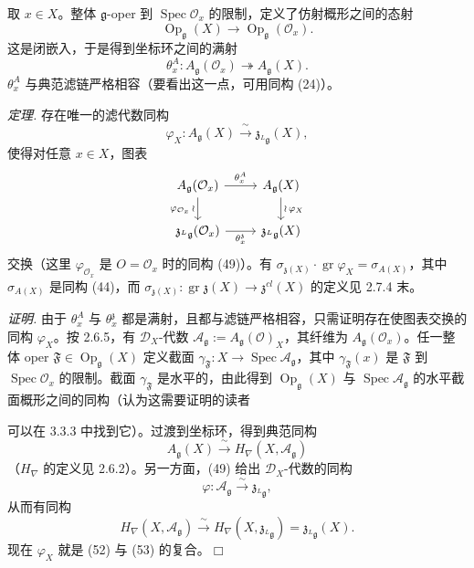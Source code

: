 
取 $x\in X$。整体 $\mathfrak{g}$-oper 到 $\operatorname{Spec}\mathcal{O}_{x}$ 的限制，定义了仿射概形之间的态射
\[
  \operatorname{Op}_{\mathfrak{g}}(X)\longrightarrow\operatorname{Op}_{\mathfrak{g}}(\mathcal{O}_{x}).
\]
这是闭嵌入，于是得到坐标环之间的满射
\begin{equation}\tag{50}
  \theta_{x}^{A} : A_{\mathfrak{g}}(\mathcal{O}_{x})\twoheadrightarrow A_{\mathfrak{g}}(X).
\end{equation}
$\theta_{x}^{A}$ 与典范滤链严格相容（要看出这一点，可用同构 (24)）。

 \emph{定理.} 存在唯一的滤代数同构
\begin{equation}\tag{51}
  \varphi_{X} : A_{\mathfrak{g}}(X)\xrightarrow{\ \sim\ }\mathfrak{z}_{{}^{L}\mathfrak{g}}(X),
\end{equation}
使得对任意 $x\in X$，图表
\[
\begin{tikzcd}
  A_{\mathfrak{g}}(\mathcal{O}_{x}) \arrow[r, "\theta_{x}^{A}"] \arrow[d, "\varphi_{\mathcal{O}_{x}}\,\wr"']
    & A_{\mathfrak{g}}(X) \arrow[d, "\wr\,\varphi_{X}"] \\
  \mathfrak{z}_{{}^{L}\mathfrak{g}}(\mathcal{O}_{x}) \arrow[r, "\theta_{x}^{\mathfrak{z}}"']
    & \mathfrak{z}_{{}^{L}\mathfrak{g}}(X)
\end{tikzcd}
\]
交换（这里 $\varphi_{\mathcal{O}_{x}}$ 是 $O=\mathcal{O}_{x}$ 时的同构 (49)）。有 $\sigma_{\mathfrak{z}(X)}\cdot\operatorname{gr}\varphi_{X}=\sigma_{A(X)}$，其中 $\sigma_{A(X)}$ 是同构 (44)，而 $\sigma_{\mathfrak{z}(X)}:\operatorname{gr}\mathfrak{z}(X)\to\mathfrak{z}^{cl}(X)$ 的定义见 2.7.4 末。

\emph{证明.} 由于 $\theta_{x}^{A}$ 与 $\theta_{x}^{\mathfrak{z}}$ 都是满射，且都与滤链严格相容，只需证明存在使图表交换的同构 $\varphi_{X}$。按 2.6.5，有 $\mathcal{D}_{X}$-代数 $\mathcal{A}_{\mathfrak{g}}:=A_{\mathfrak{g}}(\mathcal{O})_{X}$，其纤维为 $A_{\mathfrak{g}}(\mathcal{O}_{x})$。任一整体 oper $\mathfrak{F}\in\operatorname{Op}_{\mathfrak{g}}(X)$ 定义截面 $\gamma_{\mathfrak{F}}:X\to\operatorname{Spec}\mathcal{A}_{\mathfrak{g}}$，其中 $\gamma_{\mathfrak{F}}(x)$ 是 $\mathfrak{F}$ 到 $\operatorname{Spec}\mathcal{O}_{x}$ 的限制。截面 $\gamma_{\mathfrak{F}}$ 是水平的，由此得到 $\operatorname{Op}_{\mathfrak{g}}(X)$ 与 $\operatorname{Spec}\mathcal{A}_{\mathfrak{g}}$ 的水平截面概形之间的同构（认为这需要证明的读者

可以在 3.3.3 中找到它）。过渡到坐标环，得到典范同构
\begin{equation}\tag{52}
  A_{\mathfrak{g}}(X)\xrightarrow{\ \sim\ }H_{\nabla}(X,\mathcal{A}_{\mathfrak{g}})
\end{equation}
（$H_{\nabla}$ 的定义见 2.6.2）。另一方面，(49) 给出 $\mathcal{D}_{X}$-代数的同构
\[
  \varphi : \mathcal{A}_{\mathfrak{g}}\xrightarrow{\ \sim\ }\mathfrak{z}_{{}^{L}\mathfrak{g}},
\]
从而有同构
\begin{equation}\tag{53}
  H_{\nabla}(X,\mathcal{A}_{\mathfrak{g}})\xrightarrow{\ \sim\ }H_{\nabla}(X,\mathfrak{z}_{{}^{L}\mathfrak{g}})
  =\mathfrak{z}_{{}^{L}\mathfrak{g}}(X).
\end{equation}
现在 $\varphi_{X}$ 就是 (52) 与 (53) 的复合。\hfill$\Box$

